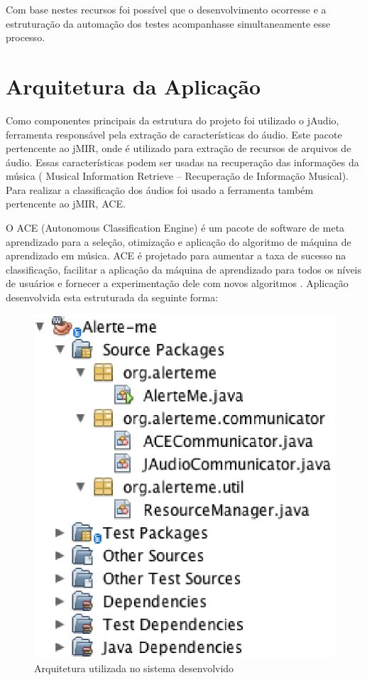 Com base nestes recursos foi possível que o desenvolvimento ocorresse e a estruturação da automação dos testes acompanhasse simultaneamente esse processo. 

\section{Arquitetura da Aplicação}

Como componentes principais da estrutura do projeto foi utilizado o jAudio, ferramenta responsável pela extração de características do áudio. Este pacote pertencente ao jMIR, onde é utilizado para extração de recursos de arquivos de áudio. Essas características podem ser usadas na recuperação das informações da música ( Musical Information Retrieve – Recuperação de Informação Musical). Para realizar a classificação dos áudios foi usado a ferramenta também pertencente ao jMIR, ACE.

O ACE (Autonomous Classification Engine) é um pacote de software de meta aprendizado para a seleção, otimização e aplicação do algoritmo de máquina de aprendizado em música. ACE é projetado para aumentar a taxa de sucesso na classificação, facilitar a aplicação da máquina de aprendizado para todos os níveis de usuários e fornecer a experimentação dele com novos algoritmos \cite{ace}. Aplicação desenvolvida esta estruturada da seguinte forma: 

\begin{figure}[H]
	\centering
	\captionsetup{justification=centering,margin=2cm}
	\includegraphics[scale=0.80]{capitulos/validacao/figuras/arquiteturaDoSistemaDesenvolvido.eps}
	\caption{Arquitetura utilizada no sistema desenvolvido}
	\label{fig:result-engajamento}
\end{figure}

